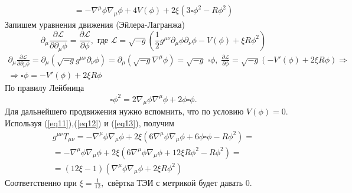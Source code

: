 \documentclass[12pt]{article}
\theoremstyle{definition}
\begin{document}
\begin{enumerate}
\begin{multline}
    =-\nabla^{\mu}\phi\nabla_{\mu}\phi+4V(\phi)+2\xi\left(3\square \phi^2-R\phi^2\right)
\end{multline}
Запишем уравнения движения (Эйлера-Лагранжа)
\begin{equation}
    \partial_{\mu}\frac{\partial \mathcal{L}}{\partial \partial_\mu \phi}=\frac{\partial \mathcal{L}}{\partial \phi}, \text{ где $\mathcal{L}=\sqrt{-g}\left(\frac{1}{2}g^{\mu\nu}\partial_{\mu}\phi\partial_{\nu}\phi-V(\phi)+\xi R \phi^2\right)$}
\end{equation}
\begin{multline}\label{eq12}
    \partial_{\mu}\frac{\partial \mathcal{L}}{\partial \partial_\mu \phi}=\partial_{\mu}(\sqrt{-g}g^{\mu\nu}\partial_{\nu}\phi)=\partial_{\mu}(\sqrt{-g}\nabla^{\mu}\phi)=\sqrt{-g}\;\square\phi,\; \frac{\partial \mathcal{L}}{\partial \phi}= \sqrt{-g}\left(-V'(\phi)+ 2\xi R \phi\right)\Rightarrow\\
    \Rightarrow \square\phi=-V'(\phi)+ 2\xi R \phi
\end{multline}
По правилу Лейбница 
\begin{equation}\label{eq13}
    \square \phi^2=2\nabla_\mu\phi\nabla^\mu\phi+2\phi\square\phi.
\end{equation}
Для дальнейшего продвижения нужно вспомнить, что по условию $V(\phi)=0$.\\
Используя (\ref{eq11}),(\ref{eq12}) и (\ref{eq13}), получим
\begin{multline}
    g^{\mu\nu}T_{\mu\nu}=-\nabla^{\mu}\phi\nabla_{\mu}\phi+2\xi\left(6\nabla^\mu\phi\nabla_\mu\phi+6\phi\square\phi-R\phi^2\right)=\\
    =-\nabla^{\mu}\phi\nabla_{\mu}\phi+2\xi\left(6\nabla^\mu\phi\nabla_\mu\phi+12\xi R \phi^2-R\phi^2\right)=\\
    =(12\xi-1)(\nabla^{\mu}\phi\nabla_{\mu}\phi+2\xi R \phi^2)
\end{multline}
Соответственно при $\xi=\frac{1}{12},$ свёртка ТЭИ с метрикой будет давать 0.
\end{enumerate}
\end{document}
